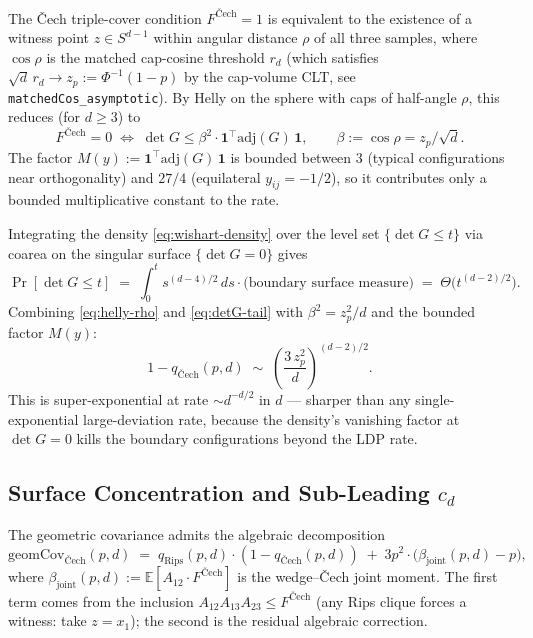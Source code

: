\documentclass[reqno,12pt]{amsart}
\newcommand{\geomCov}{\mathrm{geomCov}}
\theoremstyle{plain}
\theoremstyle{definition}
\theoremstyle{remark}
\begin{document}
The \v{C}ech triple-cover condition $F^{\text{\v{C}ech}} = 1$ is equivalent to the
existence of a witness point $z \in S^{d-1}$ within angular distance $\rho$ of all
three samples, where $\cos\rho$ is the matched cap-cosine threshold $r_d$ (which
satisfies $\sqrt{d} \, r_d \to z_p := \Phi^{-1}(1 - p)$ by the cap-volume CLT, see
\texttt{matchedCos\_asymptotic}). By Helly on the sphere with caps of half-angle
$\rho$, this reduces (for $d \ge 3$) to
\begin{equation}\label{eq:helly-rho}
  F^{\text{\v{C}ech}} = 0
  \;\Longleftrightarrow\;
  \det G \le \beta^2 \cdot \mathbf{1}^\top \mathrm{adj}(G) \, \mathbf{1},
  \qquad \beta := \cos\rho = z_p / \sqrt{d}.
\end{equation}
The factor $M(y) := \mathbf{1}^\top \mathrm{adj}(G) \, \mathbf{1}$
is bounded between $3$ (typical configurations near orthogonality) and $27/4$
(equilateral $y_{ij} = -1/2$), so it contributes only a bounded multiplicative
constant to the rate.

Integrating the density \eqref{eq:wishart-density} over the level set
$\{\det G \le t\}$ via coarea on the singular surface $\{\det G = 0\}$ gives
\begin{equation}\label{eq:detG-tail}
  \Pr[\det G \le t] \;=\; \int_0^t s^{(d-4)/2} \, ds
  \cdot \big(\text{boundary surface measure}\big)
  \;=\; \Theta\bigl(t^{(d-2)/2}\bigr).
\end{equation}
Combining \eqref{eq:helly-rho} and \eqref{eq:detG-tail} with $\beta^2 = z_p^2/d$
and the bounded factor $M(y)$:
\begin{equation}\label{eq:cech-tail}
  \boxed{\;1 - q_{\text{\v{C}ech}}(p, d)
  \;\sim\; \left(\frac{3 \, z_p^2}{d}\right)^{(d-2)/2}.\;}
\end{equation}
This is super-exponential at rate $\sim d^{-d/2}$ in $d$ — sharper than any
single-exponential large-deviation rate, because the density's vanishing factor
at $\det G = 0$ kills the boundary configurations beyond the LDP rate.

\subsection{Surface Concentration and Sub-Leading $c_d$}\label{app:wishart-cd}

The geometric covariance admits the algebraic decomposition
\begin{equation}\label{eq:geomCov-decomp}
  \geomCov_{\text{\v{C}ech}}(p, d)
  \;=\; q_{\text{Rips}}(p, d) \cdot (1 - q_{\text{\v{C}ech}}(p, d))
  \;+\; 3 p^2 \cdot \bigl(\beta_{\mathrm{joint}}(p, d) - p\bigr),
\end{equation}
where $\beta_{\mathrm{joint}}(p, d) := \mathbb E[A_{12} \cdot F^{\text{\v{C}ech}}]$
is the wedge--\v{C}ech joint moment. The first term comes from the inclusion
$A_{12} A_{13} A_{23} \le F^{\text{\v{C}ech}}$ (any Rips clique forces a witness:
take $z = x_1$); the second is the residual algebraic correction.
\end{document}
